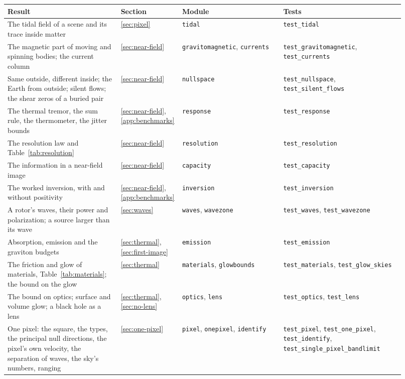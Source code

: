 \begin{table}
\centering
\begin{tabular}{p{0.29\linewidth}p{0.08\linewidth}p{0.25\linewidth}p{0.30\linewidth}}
Result & Section & Module & Tests \\ \hline
The tidal field of a scene and its trace inside matter & \ref{sec:pixel} & \texttt{tidal} & \texttt{test\_tidal} \\
The magnetic part of moving and spinning bodies; the current column & \ref{sec:near-field} & \texttt{gravitomagnetic}, \texttt{currents} & \texttt{test\_gravitomagnetic}, \texttt{test\_currents} \\
Same outside, different inside; the Earth from outside; silent flows; the shear zeros of a buried pair & \ref{sec:near-field} & \texttt{nullspace} & \texttt{test\_nullspace}, \texttt{test\_silent\_flows} \\
The thermal tremor, the sum rule, the thermometer, the jitter bounds & \ref{sec:near-field}, \ref{app:benchmarks} & \texttt{response} & \texttt{test\_response} \\
The resolution law and Table~\ref{tab:resolution} & \ref{sec:near-field} & \texttt{resolution} & \texttt{test\_resolution} \\
The information in a near-field image & \ref{sec:near-field} & \texttt{capacity} & \texttt{test\_capacity} \\
The worked inversion, with and without positivity & \ref{sec:near-field}, \ref{app:benchmarks} & \texttt{inversion} & \texttt{test\_inversion} \\
A rotor's waves, their power and polarization; a source larger than its wave & \ref{sec:waves} & \texttt{waves}, \texttt{wavezone} & \texttt{test\_waves}, \texttt{test\_wavezone} \\
Absorption, emission and the graviton budgets & \ref{sec:thermal}, \ref{sec:first-image} & \texttt{emission} & \texttt{test\_emission} \\
The friction and glow of materials, Table~\ref{tab:materials}; the bound on the glow & \ref{sec:thermal} & \texttt{materials}, \texttt{glowbounds} & \texttt{test\_materials}, \texttt{test\_glow\_skies} \\
The bound on optics; surface and volume glow; a black hole as a lens & \ref{sec:thermal}, \ref{sec:no-lens} & \texttt{optics}, \texttt{lens} & \texttt{test\_optics}, \texttt{test\_lens} \\
One pixel: the square, the types, the principal null directions, the pixel's own velocity, the separation of waves, the sky's numbers, ranging & \ref{sec:one-pixel} & \texttt{pixel}, \texttt{onepixel}, \texttt{identify} & \texttt{test\_pixel}, \texttt{test\_one\_pixel}, \texttt{test\_identify}, \texttt{test\_single\_pixel\_bandlimit} \\

\end{tabular}
\end{table}
